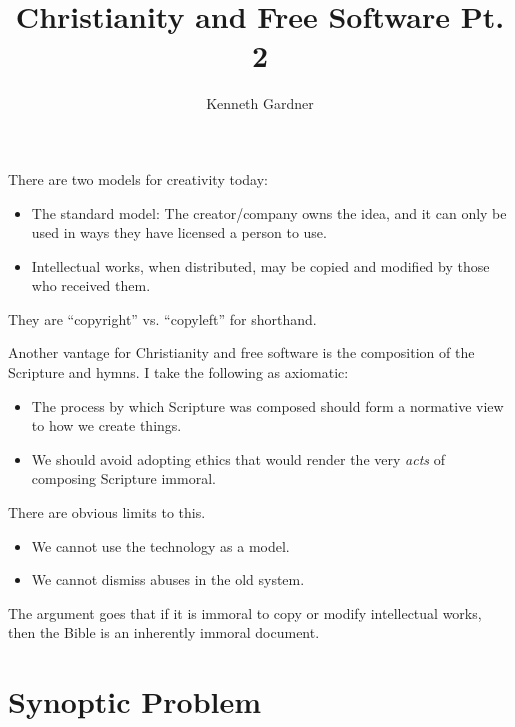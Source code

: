 \documentclass{beamer}
\title{Christianity and Free Software Pt. 2}
\author{Kenneth Gardner}
\begin{document}
\maketitle

\begin{frame}
  There are two models for creativity today:\pause
  \begin{itemize}
	\item The standard model: The creator/company owns the idea, and it can only be used in ways they have licensed a person to use.\pause
	\item Intellectual works, when distributed, may be copied and modified by those who received them.
  \end{itemize}
\end{frame}

\begin{frame}
  They are ``copyright'' vs. ``copyleft'' for shorthand.
\end{frame}

\begin{frame}
  Another vantage for Christianity and free software is the composition of the Scripture and hymns.
  I take the following as axiomatic:\pause
  \begin{itemize}
	\item The process by which Scripture was composed should form a normative view to how we create things.\pause
	\item We should avoid adopting ethics that would render the very \emph{acts} of composing Scripture immoral.
  \end{itemize}
\end{frame}

\begin{frame}
  There are obvious limits to this.\pause
  \begin{itemize}
	\item We cannot use the technology as a model.\pause
	\item We cannot dismiss abuses in the old system.
  \end{itemize}
\end{frame}

\begin{frame}
  The argument goes that if it is immoral to copy or modify intellectual works, then the Bible is an inherently immoral document.
\end{frame}

\section{Synoptic Problem}
\end{document}
